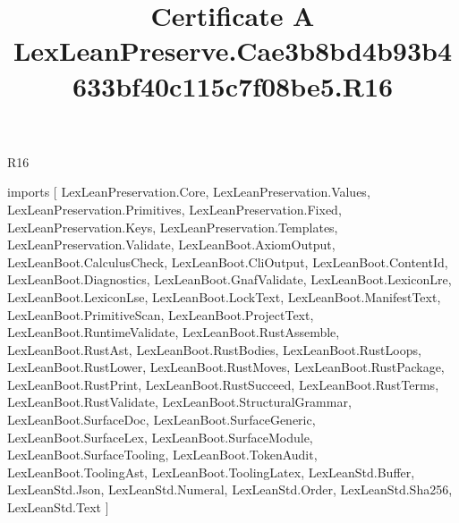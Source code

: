 \begin{lexlean}{R16}
\title{Certificate A LexLeanPreserve.Cae3b8bd4b93b4633bf40c115c7f08be5.R16}
\begin{coremodule}
imports [
  LexLeanPreservation.Core,
  LexLeanPreservation.Values,
  LexLeanPreservation.Primitives,
  LexLeanPreservation.Fixed,
  LexLeanPreservation.Keys,
  LexLeanPreservation.Templates,
  LexLeanPreservation.Validate,
  LexLeanBoot.AxiomOutput,
  LexLeanBoot.CalculusCheck,
  LexLeanBoot.CliOutput,
  LexLeanBoot.ContentId,
  LexLeanBoot.Diagnostics,
  LexLeanBoot.GnafValidate,
  LexLeanBoot.LexiconLre,
  LexLeanBoot.LexiconLse,
  LexLeanBoot.LockText,
  LexLeanBoot.ManifestText,
  LexLeanBoot.PrimitiveScan,
  LexLeanBoot.ProjectText,
  LexLeanBoot.RuntimeValidate,
  LexLeanBoot.RustAssemble,
  LexLeanBoot.RustAst,
  LexLeanBoot.RustBodies,
  LexLeanBoot.RustLoops,
  LexLeanBoot.RustLower,
  LexLeanBoot.RustMoves,
  LexLeanBoot.RustPackage,
  LexLeanBoot.RustPrint,
  LexLeanBoot.RustSucceed,
  LexLeanBoot.RustTerms,
  LexLeanBoot.RustValidate,
  LexLeanBoot.StructuralGrammar,
  LexLeanBoot.SurfaceDoc,
  LexLeanBoot.SurfaceGeneric,
  LexLeanBoot.SurfaceLex,
  LexLeanBoot.SurfaceModule,
  LexLeanBoot.SurfaceTooling,
  LexLeanBoot.TokenAudit,
  LexLeanBoot.ToolingAst,
  LexLeanBoot.ToolingLatex,
  LexLeanStd.Buffer,
  LexLeanStd.Json,
  LexLeanStd.Numeral,
  LexLeanStd.Order,
  LexLeanStd.Sha256,
  LexLeanStd.Text
]


\end{coremodule}
\end{lexlean}
